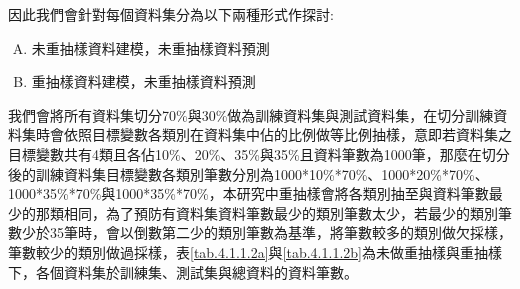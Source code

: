 	因此我們會針對每個資料集分為以下兩種形式作探討:
\begin{enumerate}[A.]
\setlength{\itemsep}{-10pt}
\item 未重抽樣資料建模，未重抽樣資料預測
\item 重抽樣資料建模，未重抽樣資料預測
\end{enumerate}

	我們會將所有資料集切分70\%與30\%做為訓練資料集與測試資料集，在切分訓練資料集時會依照目標變數各類別在資料集中佔的比例做等比例抽樣，意即若資料集之目標變數共有4類且各佔10\%、20\%、35\%與35\%且資料筆數為1000筆，那麼在切分後的訓練資料集目標變數各類別筆數分別為1000*10\%*70\%、1000*20\%*70\%、1000*35\%*70\%與1000*35\%*70\%，本研究中重抽樣會將各類別抽至與資料筆數最少的那類相同，為了預防有資料集資料筆數最少的類別筆數太少，若最少的類別筆數少於35筆時，會以倒數第二少的類別筆數為基準，將筆數較多的類別做欠採樣，筆數較少的類別做過採樣，表\ref{tab.4.1.1.2a}與\ref{tab.4.1.1.2b}為未做重抽樣與重抽樣下，各個資料集於訓練集、測試集與總資料的資料筆數。
	
	
\begin{table}[H]
	\footnotesize
    \centering
    \extrarowheight=3pt
    \caption{各資料集樣態 - A形式}\label{tab.4.1.1.2a}
\end{table}	


